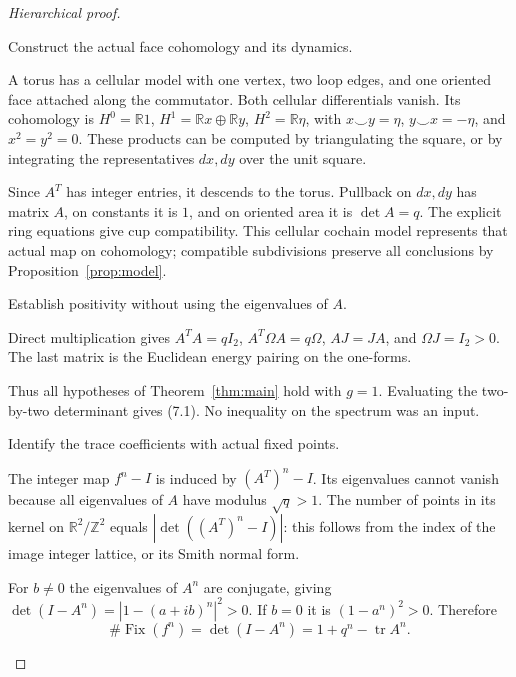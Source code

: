 \documentclass[11pt,a4paper]{article}
\theoremstyle{remark}\newtheorem{remark}[definition]{Remark}
\newcommand{\R}{\mathbb R}\newcommand{\C}{\mathbb C}\newcommand{\Z}{\mathbb Z}
\newcommand{\tr}{\operatorname{tr}}\newcommand{\im}{\operatorname{im}}
\begin{document}
\begin{proof}[Hierarchical proof]
\begin{steps}
\item Construct the actual face cohomology and its dynamics.
\begin{steps}
\item A torus has a cellular model with one vertex, two loop edges, and one oriented face attached along the commutator. Both cellular differentials vanish. Its cohomology is $H^0=\R1$, $H^1=\R x\oplus\R y$, $H^2=\R\eta$, with $x\smile y=\eta$, $y\smile x=-\eta$, and $x^2=y^2=0$. These products can be computed by triangulating the square, or by integrating the representatives $dx,dy$ over the unit square.
\item Since $A^T$ has integer entries, it descends to the torus. Pullback on $dx,dy$ has matrix $A$, on constants it is $1$, and on oriented area it is $\det A=q$. The explicit ring equations give cup compatibility. This cellular cochain model represents that actual map on cohomology; compatible subdivisions preserve all conclusions by Proposition~\ref{prop:model}.
\end{steps}
\item Establish positivity without using the eigenvalues of $A$.
\begin{steps}
\item Direct multiplication gives $A^TA=qI_2$, $A^T\Omega A=q\Omega$, $AJ=JA$, and $\Omega J=I_2>0$. The last matrix is the Euclidean energy pairing on the one-forms.
\item Thus all hypotheses of Theorem~\ref{thm:main} hold with $g=1$. Evaluating the two-by-two determinant gives (7.1). No inequality on the spectrum was an input.
\end{steps}
\item Identify the trace coefficients with actual fixed points.
\begin{steps}
\item The integer map $f^n-I$ is induced by $(A^T)^n-I$. Its eigenvalues cannot vanish because all eigenvalues of $A$ have modulus $\sqrt q>1$. The number of points in its kernel on $\R^2/\Z^2$ equals $|\det((A^T)^n-I)|$: this follows from the index of the image integer lattice, or its Smith normal form.
\item For $b\ne0$ the eigenvalues of $A^n$ are conjugate, giving $\det(I-A^n)=|1-(a+ib)^n|^2>0$. If $b=0$ it is $(1-a^n)^2>0$. Therefore
\[
\#\operatorname{Fix}(f^n)=\det(I-A^n)=1+q^n-\tr A^n.
\]
\end{steps}

\end{steps}
\end{proof}
\end{document}
